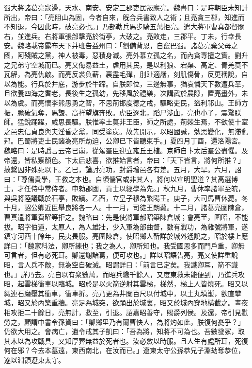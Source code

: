 \begin{pinyinscope}
蜀大將諸葛亮寇邊，天水、南安、安定三郡吏民叛應亮。魏書曰：是時朝臣未知計所出，帝曰：「亮阻山為固，今者自來，旣合兵書致人之術；且亮貪三郡，知進而不知退，今因此時，破亮必也。」乃部勒兵馬步騎五萬拒亮。遣大將軍曹真都督關右，並進兵。右將軍張郃擊亮於街亭，大破之。亮敗走，三郡平。丁未，行幸長安。魏略載帝露布天下并班告益州曰：「劉備背恩，自竄巴蜀。諸葛亮棄父母之國，阿殘賊之黨，神人被毒，惡積身滅。亮外慕立孤之名，而內貪專擅之實。劉升之兄弟守空城而已。亮又侮易益土，虐用其民，是以利狼、宕渠、高定、青羌莫不瓦解，為亮仇敵。而亮反裘負薪，裏盡毛殫，刖趾適屨，刻肌傷骨，反更稱說，自以為能。行兵於井底，游步於牛蹄。自朕即位，三邊無事，猶哀憐天下數遭兵革，且欲養四海之耆老，長後生之孤幼，先移風於禮樂，次講武於農隙，置亮畫外，未以為虞。而亮懷李熊愚勇之智，不思荊邯度德之戒，驅略吏民，盜利祁山。王師方振，膽破氣奪，馬謖、高祥望旗奔敗。虎臣逐北，蹈尸涉血，亮也小子，震驚朕師。猛銳踊躍，咸思長驅。朕惟率土莫非王臣，師之所處，荊棘生焉，不欲使十室之邑忠信貞良與夫淫昏之黨，同受塗炭。故先開示，以昭國誠，勉思變化，無滯亂邦。巴蜀將吏士民諸為亮所劫迫，公卿已下皆聽束手。」夏四月丁酉，還洛陽宮。魏略曰：是時譌言云帝已崩，從駕羣臣迎立雍丘王植。京師自卞太后羣公盡懼。及帝還，皆私察顏色。卞太后悲喜，欲推始言者，帝曰：「天下皆言，將何所推？」赦繫囚非殊死以下。乙巳，論討亮功，封爵增邑各有差。五月，大旱。六月，詔曰：「尊儒貴學，王教之本也。自頃儒官或非其人，將何以宣明聖道？其高選博士，才任侍中常侍者。申勑郡國，貢士以經學為先。」秋九月，曹休率諸軍至皖，與吳將陸議戰於石亭，敗績。乙酉，立皇子穆為繁陽王。庚子，大司馬曹休薨。冬十月，詔公卿近臣舉良將各一人。十一月，司徒王朗薨。十二月，諸葛亮圍陳倉，曹真遣將軍費曜等拒之。魏略曰：先是使將軍郝昭築陳倉城；會亮至，圍昭，不能拔。昭字伯道，太原人，為人雄壯，少入軍為部曲督，數有戰功，為雜號將軍，遂鎮守河西十餘年，民夷畏服。亮圍陳倉，使昭鄉人靳詳於城外遙說之，昭於樓上應詳曰：「魏家科法，卿所練也；我之為人，卿所知也。我受國恩多而門戶重，卿無可言者，但有必死耳。卿還謝諸葛，便可攻也。」詳以昭語告亮，亮又使詳重說昭，言人兵不敵，無為空自破滅。昭謂詳曰：「前言已定矣。我識卿耳，箭不識也。」詳乃去。亮自以有衆數萬，而昭兵纔千餘人，又度東救未能便到，乃進兵攻昭，起雲梯衝車以臨城。昭於是以火箭逆射其雲梯，梯然，梯上人皆燒死。昭又以繩連石磨壓其衝車，衝車折。亮乃更為井闌百尺以付城中，以土丸填壍，欲直攀城，昭又於內築重牆。亮足為城突，欲踊出於城裏，昭又於城內穿地橫截之。晝夜相攻拒二十餘日，亮無計，救至，引退。詔嘉昭善守，賜爵列侯。及還，帝引見慰勞之，顧謂中書令孫資曰：「卿鄉里乃有爾曹快人，為將灼如此，朕復何憂乎？」仍欲大用之。會病亡，遺令戒其子凱曰：「吾為將，知將不可為也。吾數發冢，取其木以為攻戰具，又知厚葬無益於死者也。汝必斂以時服。且人生有處所耳，死復何在邪？今去本墓遠，東西南北，在汝而已。」遼東太守公孫恭兄子淵劫奪恭位，遂以淵領遼東太守。


\end{pinyinscope}
